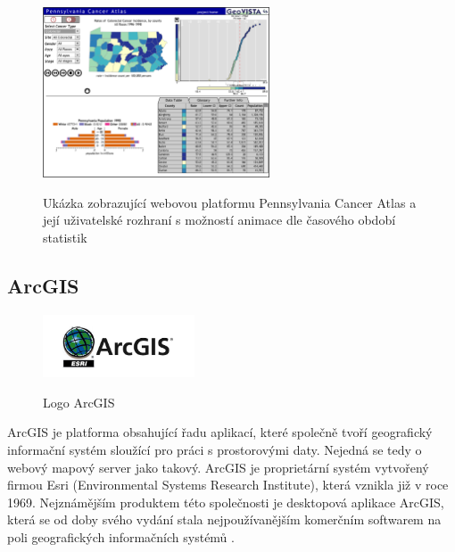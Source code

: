 \begin{figure}[h!]  \centering
\includegraphics[width=0.6\textwidth]{../img/pennsylvania-cancer-atlas.png}
	\caption{Ukázka zobrazující webovou platformu Pennsylvania
Cancer Atlas a její uživatelské rozhraní s možností animace dle
časového období statistik}
	\cite{cancer-atlas}
	\label{fig:cancer-atlas}
\end{figure}
 
\newpage

\subsection{ArcGIS}

\begin{figure}[h!]  \centering
\includegraphics[width=0.4\textwidth]{../img/arcgis-logo.jpg}
	\caption{Logo ArcGIS}
	\cite{arcgis-logo}
	\label{fig:arcgis-logo}
\end{figure} \bigskip

ArcGIS je platforma obsahující řadu aplikací, které společně tvoří
geografický informační systém sloužící pro práci s prostorovými
daty. Nejedná se tedy o webový mapový server jako takový. ArcGIS je
proprietární systém vytvořený firmou Esri (Environmental Systems Research
Institute), která vznikla již v roce 1969. Nejznámějším produktem této společnosti je desktopová aplikace ArcGIS, která
se od doby svého vydání stala nejpoužívanějším komerčním softwarem na poli geografických informačních systémů \cite{arcgis-wiki}.

